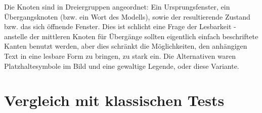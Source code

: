 Die Knoten sind in Dreiergruppen angeordnet: Ein Ursprungsfenster, ein Übergangsknoten
(bzw. ein Wort des Modells), sowie der resultierende Zustand bzw. das sich öffnende Fenster.
Dies ist schlicht eine Frage der Lesbarkeit - anstelle der mittleren Knoten für Übergänge sollten
eigentlich einfach beschriftete Kanten benutzt werden, aber dies schränkt die Möglichkeiten,
den anhängigen Text in eine lesbare Form zu bringen, zu stark ein. Die Alternativen waren
Platzhaltesymbole im Bild und eine gewaltige Legende, oder diese Variante.


\section{Vergleich mit klassischen Tests}\label{section:testcomparisonclassic}

